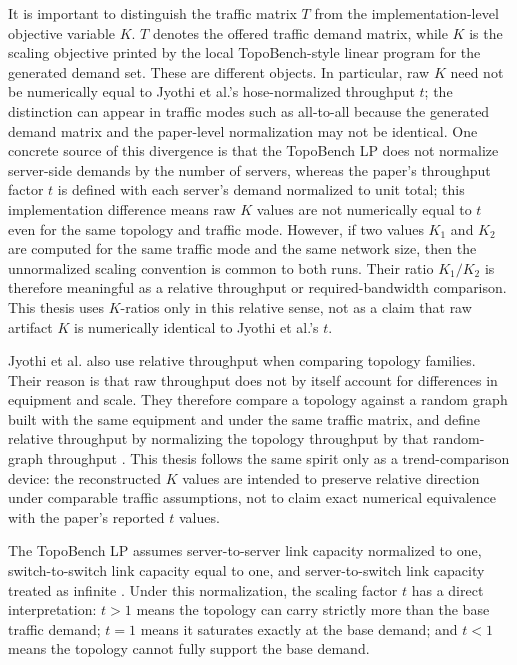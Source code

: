 \documentclass[conference]{IEEEtran}
\begin{document}
It is important to distinguish the traffic matrix \(T\) from the implementation-level objective variable \(K\). \(T\) denotes the offered traffic demand matrix, while \(K\) is the scaling objective printed by the local TopoBench-style linear program for the generated demand set. These are different objects. In particular, raw \(K\) need not be numerically equal to Jyothi et al.'s hose-normalized throughput \(t\); the distinction can appear in traffic modes such as all-to-all because the generated demand matrix and the paper-level normalization may not be identical. One concrete source of this divergence is that the TopoBench LP does not normalize server-side demands by the number of servers, whereas the paper's throughput factor \(t\) is defined with each server's demand normalized to unit total; this implementation difference means raw \(K\) values are not numerically equal to \(t\) even for the same topology and traffic mode. However, if two values \(K_1\) and \(K_2\) are computed for the same traffic mode and the same network size, then the unnormalized scaling convention is common to both runs. Their ratio \(K_1/K_2\) is therefore meaningful as a relative throughput or required-bandwidth comparison. This thesis uses \(K\)-ratios only in this relative sense, not as a claim that raw artifact \(K\) is numerically identical to Jyothi et al.'s \(t\).

Jyothi et al. also use relative throughput when comparing topology families. Their reason is that raw throughput does not by itself account for differences in equipment and scale. They therefore compare a topology against a random graph built with the same equipment and under the same traffic matrix, and define relative throughput by normalizing the topology throughput by that random-graph throughput \cite{jyothi2016}. This thesis follows the same spirit only as a trend-comparison device: the reconstructed \(K\) values are intended to preserve relative direction under comparable traffic assumptions, not to claim exact numerical equivalence with the paper's reported \(t\) values.

The TopoBench LP assumes server-to-server link capacity normalized to one, switch-to-switch link capacity equal to one, and server-to-switch link capacity treated as infinite \cite{jyothi2016}. Under this normalization, the scaling factor \(t\) has a direct interpretation: \(t > 1\) means the topology can carry strictly more than the base traffic demand; \(t = 1\) means it saturates exactly at the base demand; and \(t < 1\) means the topology cannot fully support the base demand.
\end{document}
